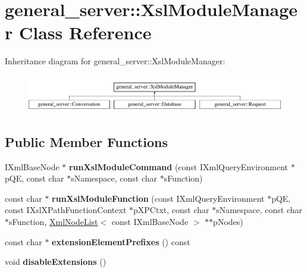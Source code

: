 \hypertarget{classgeneral__server_1_1XslModuleManager}{\section{general\-\_\-server\-:\-:\-Xsl\-Module\-Manager \-Class \-Reference}
\label{classgeneral__server_1_1XslModuleManager}
}
\-Inheritance diagram for general\-\_\-server\-:\-:\-Xsl\-Module\-Manager\-:\begin{figure}[H]
\begin{center}
\leavevmode
\includegraphics[height=1.666667cm]{classgeneral__server_1_1XslModuleManager}
\end{center}
\end{figure}
\subsection*{\-Public \-Member \-Functions}
\begin{DoxyCompactItemize}
\item 
\hypertarget{classgeneral__server_1_1XslModuleManager_a0c8dc799eefb3f5e67f323ff24e5cf22}{\-I\-Xml\-Base\-Node $\ast$ {\bfseries run\-Xsl\-Module\-Command} (const \-I\-Xml\-Query\-Environment $\ast$p\-Q\-E, const char $\ast$s\-Namespace, const char $\ast$s\-Function)}\label{classgeneral__server_1_1XslModuleManager_a0c8dc799eefb3f5e67f323ff24e5cf22}

\item 
\hypertarget{classgeneral__server_1_1XslModuleManager_a564742345c7b0196294daef0d8ee62db}{const char $\ast$ {\bfseries run\-Xsl\-Module\-Function} (const \-I\-Xml\-Query\-Environment $\ast$p\-Q\-E, const \-I\-Xsl\-X\-Path\-Function\-Context $\ast$p\-X\-P\-Ctxt, const char $\ast$s\-Namespace, const char $\ast$s\-Function, \hyperlink{classgeneral__server_1_1XmlNodeList}{\-Xml\-Node\-List}$<$ const \-I\-Xml\-Base\-Node $>$ $\ast$$\ast$p\-Nodes)}\label{classgeneral__server_1_1XslModuleManager_a564742345c7b0196294daef0d8ee62db}

\item 
\hypertarget{classgeneral__server_1_1XslModuleManager_aee0bbaf6bae69d425ee078adf0a2d8db}{const char $\ast$ {\bfseries extension\-Element\-Prefixes} () const }\label{classgeneral__server_1_1XslModuleManager_aee0bbaf6bae69d425ee078adf0a2d8db}

\item 
\hypertarget{classgeneral__server_1_1XslModuleManager_a66ecd78923e1398482035285e5972ace}{void {\bfseries disable\-Extensions} ()}\label{classgeneral__server_1_1XslModuleManager_a66ecd78923e1398482035285e5972ace}

\end{DoxyCompactItemize}
